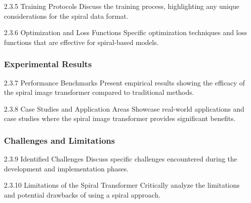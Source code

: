     

    2.3.5 Training Protocols
    Discuss the training process, highlighting any unique considerations for the spiral data format.

    2.3.6 Optimization and Loss Functions
    Specific optimization techniques and loss functions that are effective for spiral-based models.

    \subsubsection{Experimental Results}
    2.3.7 Performance Benchmarks
    Present empirical results showing the efficacy of the spiral image transformer compared to traditional methods.

    2.3.8 Case Studies and Application Areas
    Showcase real-world applications and case studies where the spiral image transformer provides significant benefits.

    \subsubsection{Challenges and Limitations}
    2.3.9 Identified Challenges
    Discuss specific challenges encountered during the development and implementation phases.

    2.3.10 Limitations of the Spiral Transformer
    Critically analyze the limitations and potential drawbacks of using a spiral approach.
